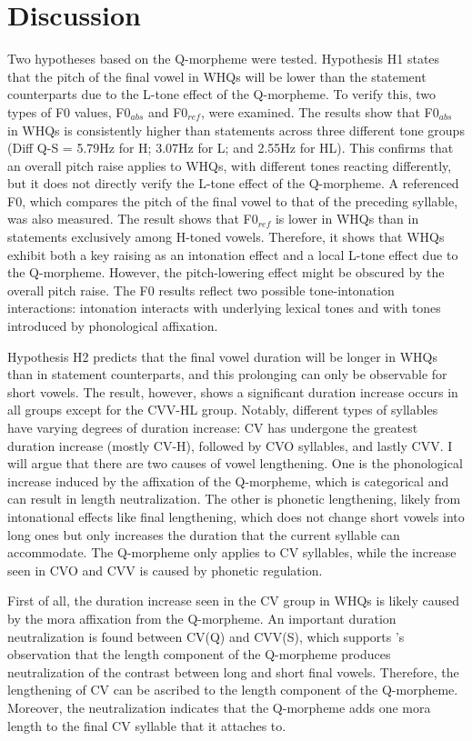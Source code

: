 \documentclass[output=paper,colorlinks,citecolor=brown
]{langscibook}
\begin{document}
\section{Discussion}
Two hypotheses based on the Q-morpheme were tested. Hypothesis H1 states that the pitch of the final vowel in WHQs will be lower than the statement counterparts due to the L-tone effect of the Q-morpheme. To verify this, two types of F0 values, F0$_{abs}$ and F0$_{ref}$, were examined. The results show that F0$_{abs}$ in WHQs is consistently higher than statements across three different tone groups (Diff Q-S = 5.79Hz for H; 3.07Hz for L; and 2.55Hz for HL). This confirms that an overall pitch raise applies to WHQs, with different tones reacting differently, but it does not directly verify the L-tone effect of the Q-morpheme. A referenced F0, which compares the pitch of the final vowel to that of the preceding syllable, was also measured. The result shows that F0$_{ref}$ is lower in WHQs than in statements exclusively among H-toned vowels. Therefore, it shows that WHQs exhibit both a key raising as an intonation effect and a local L-tone effect due to the Q-morpheme. However, the pitch-lowering effect might be obscured by the overall pitch raise. The F0 results reflect two possible tone-intonation interactions: intonation interacts with underlying lexical tones and with tones introduced by phonological affixation.

Hypothesis H2 predicts that the final vowel duration will be longer in WHQs than in statement counterparts, and this prolonging can only be observable for short vowels. The result, however, shows a significant duration increase occurs in all groups except for the CVV-HL group. Notably, different types of syllables have varying degrees of duration increase: CV has undergone the greatest duration increase (mostly CV-H), followed by CVO syllables, and lastly CVV. I will argue that there are two causes of vowel lengthening. One is the phonological increase induced by the affixation of the Q-morpheme, which is categorical and can result in length neutralization. The other is phonetic lengthening, likely from intonational effects like final lengthening, which does not change short vowels into long ones but only increases the duration that the current syllable can accommodate. The Q-morpheme only applies to CV syllables, while the increase seen in CVO and CVV is caused by phonetic regulation. 


First of all, the duration increase seen in the CV group in WHQs is likely caused by the mora affixation from the Q-morpheme. An important duration neutralization is found between CV(Q) and CVV(S), which supports \citet{newmans1981q}'s observation that the length component of the Q-morpheme produces neutralization of the contrast between long and short final vowels. Therefore, the lengthening of CV can be ascribed to the length component of the Q-morpheme. Moreover, the neutralization indicates that the Q-morpheme adds one mora length to the final CV syllable that it attaches to.
\end{document}
